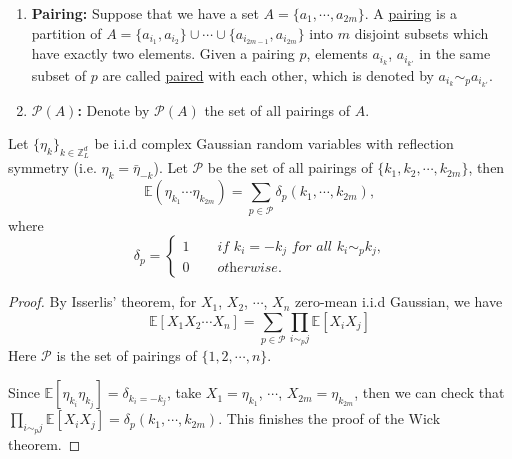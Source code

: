 \begin{defn}
\begin{enumerate}
    \item \textbf{Pairing:} Suppose that we have a set $A=\{a_1,\cdots,a_{2m}\}$. A \underline{pairing} is a partition of $A=\{a_{i_1},a_{i_2}\}\cup\cdots\cup \{a_{i_{2m-1}},a_{i_{2m}}\}$ into $m$ disjoint subsets which have exactly two elements. Given a pairing $p$, elements $a_{i_{k}}$, $a_{i_{k'}}$ in the same subset of $p$ are called \underline{paired} with each other, which is denoted by $a_{i_{k}}\sim_{p} a_{i_{k'}}$.
    \item \textbf{$\mathcal{P}(A)$:} Denote by $\mathcal{P}(A)$ the set of all pairings of $A$.
\end{enumerate}




\end{defn}

\begin{lem}\label{th.wick}
Let $\{\eta_k\}_{k\in\mathbb{Z}^d_L}$ be i.i.d complex Gaussian random variables with reflection symmetry (i.e. $\eta_{k}=\bar{\eta}_{-k}$). Let $\mathcal{P}$ be the set of all pairings of $\{k_1,k_2,\cdots,k_{2m}\}$, then
\begin{equation}
    \mathbb{E}(\eta_{k_1}\cdots \eta_{k_{2m}})=\sum_{p\in \mathcal{P}}  \delta_{p}(k_1,\cdots,k_{2m}), 
\end{equation}
where 
\begin{equation}\label{eq.deltapairing.threewave}
\delta_{p}=\begin{cases}
1\qquad \textit{if $k_{i}=-k_{j}$ for all $k_{i}\sim_{p}k_{j}$,}
\\
0\qquad \textit{otherwise.}
\end{cases}
\end{equation}
\end{lem}
\begin{proof}
By Isserlis' theorem, for $X_1$, $X_2$, $\cdots$, $X_n$ zero-mean i.i.d Gaussian, we have 
\begin{equation}
    \mathbb{E} [X_1 X_2 \cdots X_n] = \sum_{p\in\mathcal{P}} \prod_{i\sim_{p}j} \mathbb{E} [X_i X_j]
\end{equation}
Here $\mathcal{P}$ is the set of pairings of $\{1,2,\cdots,n\}$.

Since $\mathbb{E} [\eta_{k_i}\eta_{k_j}]=\delta_{k_i=-k_j}$, take $X_1=\eta_{k_1}$, $\cdots$, $X_{2m}=\eta_{k_{2m}}$, then we can check that $\prod_{i\sim_{p}j} \mathbb{E} [X_i X_j]=\delta_{p}(k_1,\cdots,k_{2m})$. This finishes the proof of the Wick theorem.
\end{proof}

